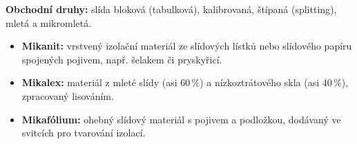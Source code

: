 \textbf{Obchodní druhy:} slída bloková (tabulková), kalibrovaná, štípaná (splitting), mletá a mikromletá.
\begin{itemize}
\item \textbf{Mikanit:} vrstvený izolační materiál ze slídových lístků nebo slídového papíru spojených pojivem, např. šelakem či pryskyřicí.
\item \textbf{Mikalex:} materiál z mleté slídy (asi 60\,\%) a nízkoztrátového skla (asi 40\,\%), zpracovaný lisováním.
\item \textbf{Mikafólium:} ohebný slídový materiál s pojivem a podložkou, dodávaný ve svitcích pro tvarování izolací.
\end{itemize}
